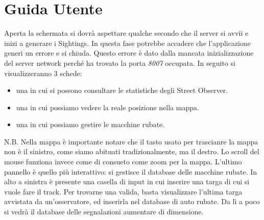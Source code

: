 \documentclass[a4paper,12pt]{report}
\begin{document}
\chapter{Guida Utente}
  
  Aperta la schermata si dovrà aspettare qualche secondo che il server si avvii 
e inizi a generare i Sightings. \newline
  In questa fase potrebbe accadere che l'applicazione generi un errore e si 
chiuda. 
Questo errore è dato dalla mancata inizializzazione del server network perché ha 
trovato la porta \textit{8007} occupata.
  In seguito si visualizzeranno 3 schede:
   \begin{itemize}
    \item una in cui si possono consultare le statistiche degli Street Observer.
    \item una in cui possiamo vedere la reale posizione nella mappa.
    \item una in cui possiamo gestire le macchine rubate.
   \end{itemize}
   
   N.B. Nella mappa è importante notare che il tasto usato per trascianre la 
mappa non è il sinistro, come siamo abituati tradizionalmente, ma il destro. Lo 
scroll del mouse funziona invece come di consueto come zoom per la mappa.
  \newline
  \newline
  L'ultimo pannello è quello più interattivo: si gestisce il database delle 
macchine rubate. In alto a sinistra è presente una casella di input in cui 
inserire una targa di cui si vuole fare il track. Per trovarne una valida, 
basta visualizzare l'ultima targa avvistata da un'osservatore, ed inserirla nel 
database di auto rubate. Da lì a poco si vedrà il database delle segnalazioni 
aumentare di dimensione.
\end{document}
